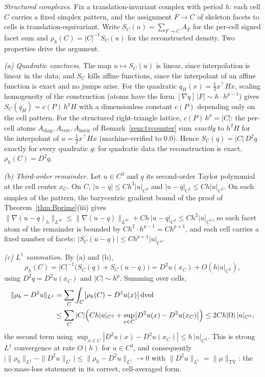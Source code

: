 \documentclass[11pt,a4paper]{article}
\theoremstyle{plain}
\theoremstyle{definition}
\theoremstyle{remark}
\newcommand{\TV}{\mathrm{TV}}
\newcommand{\dvol}{\,\mathrm{dvol}}
\begin{document}
\emph{Structured complexes.} Fix a translation-invariant complex
with period $h$: each cell $C$ carries a fixed simplex pattern, and
the assignment $F \to C$ of skeleton facets to cells is
translation-equivariant. Write $S_C(u) = \sum_{F \to C} A_F$ for the
per-cell signed facet sum and $\rho_h(C) = |C|^{-1}S_C(u)$ for the
reconstructed density. Two properties drive the argument.

\emph{(a) Quadratic exactness.} The map $u \mapsto S_C(u)$ is
linear, since interpolation is linear in the data; and $S_C$ kills
affine functions, since the interpolant of an affine function is
exact and no jumps arise. For the quadratic $q_H(x) = \tfrac12
x^{\top}Hx$, scaling homogeneity of the construction (atoms have the
form $[\nabla q]\,|F| \sim h \cdot h^{p-1}$) gives $S_C(q_H) = c(P)\,
h^{p} H$ with a dimensionless constant $c(P)$ depending only on the
cell pattern. For the structured right-triangle lattice,
$c(P)\,h^{p} = |C|$: the per-cell atoms
$A_{\mathrm{diag}}, A_{\mathrm{vert}}, A_{\mathrm{horiz}}$ of
Remark~\ref{rem:tvcounter} sum \emph{exactly} to $h^{2}H$ for the
interpolant of $u = \tfrac12 x^{\top}Hx$ (machine-verified to
$0.0$). Hence $S_C(q) = |C|\,D^{2}q$ exactly for every quadratic
$q$: for quadratic data the reconstruction is exact,
$\rho_h(C) = D^{2}q$.

\emph{(b) Third-order remainder.} Let $u \in C^{3}$ and $q$ its
second-order Taylor polynomial at the cell center $x_C$. On $C$,
$|u - q| \le Ch^{3}|u|_{C^{3}}$ and $|u - q|_{C^{2}} \le
Ch|u|_{C^{3}}$. On each simplex of the pattern, the barycentric
gradient bound of the proof of Theorem~\ref{thm:Bprime}(iii) gives
$\|\nabla (u - q)_h\|_{L^\infty} \le \|\nabla(u-q)\|_{L^\infty} +
Ch\,|u - q|_{C^{2}} \le Ch^{2}|u|_{C^{3}}$, so each facet atom of
the remainder is bounded by $Ch^{2} \cdot h^{p-1} = Ch^{p+1}$, and
each cell carries a fixed number of facets: $|S_C(u - q)| \le
Ch^{p+1}|u|_{C^{3}}$.

\emph{(c) $L^{1}$ summation.} By (a) and (b),
\[
\rho_h(C) = |C|^{-1}\bigl(S_C(q) + S_C(u-q)\bigr) = D^{2}u(x_C) +
O(h|u|_{C^{3}}),
\]
using $D^{2}q = D^{2}u(x_C)$ and $|C| \sim h^{p}$. Summing over
cells,
\[
\begin{split}
\|\rho_h - D^{2}u\|_{L^{1}}
&= \sum_{C} \int_{C} \bigl|\rho_h(C) - D^{2}u(x)\bigr| \dvol\\
&\le \sum_{C} |C| \Bigl(Ch|u|_{C^{3}} + \sup_{x \in C}
\bigl|D^{2}u(x) - D^{2}u(x_C)\bigr|\Bigr)
\le 2Ch|\Omega|\,|u|_{C^{3}},
\end{split}
\]
the second term using $\sup_{x \in C}|D^{2}u(x) - D^{2}u(x_C)| \le
h\,|u|_{C^{3}}$. This is strong $L^{1}$ convergence at rate $O(h)$
for $u \in C^{3}$, and consequently
$\bigl|\|\rho_h\|_{L^{1}} - \|D^{2}u\|_{L^{1}}\bigr| \le
\|\rho_h - D^{2}u\|_{L^{1}} \to 0$ with $\|D^{2}u\|_{L^{1}} =
\|\mu\|_{\TV}$: the no-mass-loss statement in its correct,
cell-averaged form.
\end{document}

